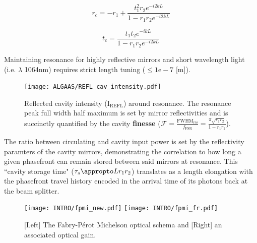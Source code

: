 \begin{equation}
	r_c = -r_1 + \frac{t^2_1r_2 e^{-i2kL}}{1-r_1 r_2 e^{-i2kL}}
\end{equation}

\begin{equation}
	t_c = \frac{t_1 t_2 e^{-ikL}}{1-r_1 r_2 e^{-i2kL}}	
\end{equation}

Maintaining resonance for highly reflective mirrors and short wavelength light (i.e. $\lambda$ 1064nm) requires strict length tuning ($\leq 1\mathrm{e-}7$ [m]). 

\begin{figure}[H]
\texttt{[image: ALGAAS/REFL\_cav\_intensity.pdf]}
\caption{Reflected cavity intensity (I$_\mathrm{REFL}$) around resonance. The resonance peak full width half maximum is set by mirror reflectivities and is succinctly quantified by the cavity \textbf{finesse} ($\mathscr{F} = \frac{\mathrm{FWHM}_\mathrm{res}}{f_\mathrm{FSR}} = \frac{\pi \sqrt{r_1 r_2}}{1-r_1 r_2}$).}
\label{fig:cav_length_response_DCpow}
\end{figure}

The ratio between circulating and cavity input power is set by the reflectivity paramters of the cavity mirrors, demonstrating the correlation to how long a given phasefront can remain stored between said mirrors at resonance. This ``cavity storage time" ($\tau_s \appropto L r_1 r_2$) translates as a length elongation with the phasefront travel history encoded in the arrival time of its photons back at the beam splitter.

\begin{figure}[ht!]
  \begin{subcaptiongroup}{\texttt{[image: INTRO/fpmi\_new.pdf]}}
  \texttt{[image: INTRO/fpmi\_fr.pdf]}
  \end{subcaptiongroup}
  \hfill
  \caption{[Left] The Fabry-P\'{e}rot Michelson optical schema and [Right] an associated optical gain.}
  \label{fig:fpmi}
\end{figure}


